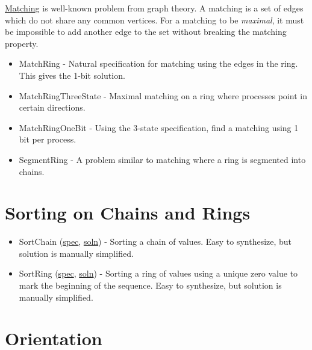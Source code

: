 \href{http://en.wikipedia.org/wiki/Matching_(graph_theory)}{Matching} is well-known problem from graph theory.
A matching is a set of edges which do not share any common vertices.
For a matching to be \textit{maximal}, it must be impossible to add another edge to the set without breaking the matching property.
\begin{itemize}
\item MatchRing \href{Matching.html#sec:MatchRing}{\LinkText}
- Natural specification for matching using the edges in the ring.
This gives the 1-bit solution.
\item MatchRingThreeState \href{Matching.html#sec:MatchRingThreeState}{\LinkText}
- Maximal matching on a ring where processes point in certain directions.
\item MatchRingOneBit \href{Matching.html#sec:MatchRingOneBit}{\LinkText}
- Using the 3-state specification, find a matching using 1 bit per process.
\item SegmentRing \href{Matching.html#sec:SegmentRing}{\LinkText}
- A problem similar to matching where a ring is segmented into chains.
\end{itemize}

\section{Sorting on Chains and Rings}

\begin{itemize}
\item SortChain (\href{\examplespec/SortChain.prot}{spec}, \href{\examplesoln/SortChain.prot}{soln})
- Sorting a chain of values.
Easy to synthesize, but solution is manually simplified.
\item SortRing (\href{\examplespec/SortRing.prot}{spec}, \href{\examplesoln/SortRing.prot}{soln})
- Sorting a ring of values using a unique zero value to mark the beginning of the sequence.
Easy to synthesize, but solution is manually simplified.
\end{itemize}

\section{Orientation}


